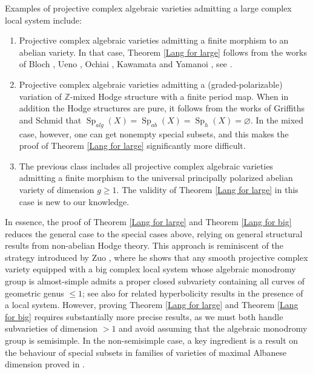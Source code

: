 \documentclass[11pt,letterpaper]{amsart}
\def\bZ{\mathbb{Z}}
\def\bZ{\mathbb{Z}}
\theoremstyle{plain}
\DeclareMathOperator{\Sp}{Sp}
\begin{document}
Examples of projective complex algebraic varieties admitting a large complex local system include:
\begin{enumerate}
    \item Projective complex algebraic varieties admitting a finite morphism to an abelian variety. In that case, Theorem \ref{Lang for large} follows from the works of Bloch \cite{Bloch26}, Ueno \cite{Ueno}, Ochiai \cite{Ochiai77}, Kawamata \cite{Kawamata80} and Yamanoi \cite{Yamanoi-maximal-Albanese}, see \cite{Bruni-relative-Lang}.
    \item Projective complex algebraic varieties admitting a (graded-polarizable) variation of $\bZ$-mixed Hodge structure with a finite period map. When in addition the Hodge structures are pure, it follows from the works of Griffiths and Schmid \cite{Griffiths-Schmid} that $ \Sp_{alg}(X) = \Sp_{ab}(X) = \Sp_h(X) = \varnothing$. In the mixed case, however, one can get nonempty special subsets, and this makes the proof of Theorem \ref{Lang for large} significantly more difficult. 
    \item The previous class includes all projective complex algebraic varieties admitting a finite morphism to the universal principally polarized abelian variety of dimension $g \geq 1$. The validity of Theorem \ref{Lang for large} in this case is new to our knowledge.
\end{enumerate}


In essence, the proof of Theorem \ref{Lang for large} and Theorem \ref{Lang for big} reduces the general case to the special cases above, relying on general structural results from non-abelian Hodge theory. This approach is reminiscent of the strategy introduced by Zuo \cite{Zuo-Chern-hyperbolicity}, where he shows that any smooth projective complex variety equipped with a big complex local system whose algebraic monodromy group is almost-simple admits a proper closed subvariety containing all curves of geometric genus $\leq 1$; see also \cite{Yamanoi-Fourier, CCE, Javanpeykar-Rousseau} for related hyperbolicity results in the presence of a local system. However, proving Theorem \ref{Lang for large} and Theorem \ref{Lang for big} requires substantially more precise results, as we must both handle subvarieties of dimension $>1$ and avoid assuming that the algebraic monodromy group is semisimple. In the non-semisimple case, a key ingredient is a result on the behaviour of special subsets in families of varieties of maximal Albanese dimension proved in \cite{Bruni-relative-Lang}.\\
\end{document}
